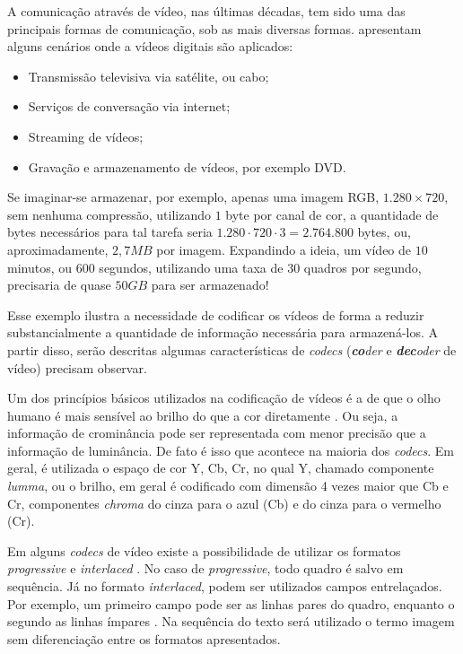 \documentclass[cic,tc]{iiufrgs}
\begin{document}
A comunicação através de vídeo, nas últimas décadas, tem sido uma das principais formas
de comunicação, sob as mais diversas formas.
\citet{SullivanH264} apresentam alguns cenários onde a vídeos digitais são aplicados:
\begin{itemize}
    \item Transmissão televisiva via satélite, ou cabo;
    \item Serviços de conversação via internet;
    \item Streaming de vídeos;
    \item Gravação e armazenamento de vídeos, por exemplo DVD.
\end{itemize}

Se imaginar-se armazenar, por exemplo, apenas uma imagem RGB, $1.280\times720$, 
sem nenhuma compressão, utilizando $1$ byte por canal de cor, a quantidade de bytes necessários 
para tal tarefa seria $1.280\cdot720\cdot3 = 2.764.800$ bytes, ou, aproximadamente, $2,7MB$
por imagem.
Expandindo a ideia, um vídeo de $10$ minutos, ou $600$ segundos, 
utilizando uma taxa de $30$ quadros por segundo,
precisaria de quase $50GB$ para ser armazenado!

Esse exemplo ilustra a necessidade de codificar os vídeos de forma a
reduzir substancialmente a quantidade de informação necessária para armazená-los.
A partir disso, serão descritas algumas características de \textit{codecs} 
(\emph{\textbf{co}der} e \emph{\textbf{dec}oder} de vídeo) precisam observar.

Um dos princípios básicos utilizados na codificação de vídeos é a de que o olho humano
é mais sensível ao brilho do que a cor diretamente \cite{SullivanH264}.
Ou seja, a informação de crominância pode ser representada com menor precisão que 
a informação de luminância.
De fato é isso que acontece na maioria dos \emph{codecs}. 
Em geral, é utilizada o espaço de cor Y, Cb, Cr, no qual Y, chamado componente \emph{lumma},
ou o brilho, em geral é codificado com dimensão 4 vezes maior que Cb e Cr, componentes 
\emph{chroma} do cinza para o azul (Cb) e do cinza para o vermelho (Cr).

Em alguns \emph{codecs} de vídeo existe a possibilidade de utilizar os formatos
\emph{progressive} e \emph{interlaced} \cite{SullivanH264}.
No caso de \emph{progressive}, todo quadro é salvo em sequência.
Já no formato \emph{interlaced}, podem ser utilizados campos entrelaçados.
Por exemplo, um primeiro campo pode ser as linhas pares do quadro, enquanto o segundo
as linhas ímpares \cite{SullivanH264}.
Na sequência do texto será utilizado o termo imagem sem diferenciação entre os 
formatos apresentados.
\end{document}
